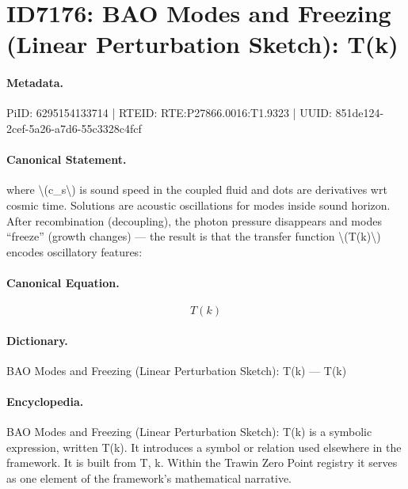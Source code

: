 \section*{ID7176: BAO Modes and Freezing (Linear Perturbation Sketch): T(k)}
\paragraph{Metadata.}
PiID: 6295154133714 | RTEID: RTE:P27866.0016:T1.9323 | UUID: 851de124-2cef-5a26-a7d6-55c3328c4fcf

\paragraph{Canonical Statement.}
where \textbackslash{}(c\_s\textbackslash{}) is sound speed in the coupled fluid and dots are derivatives wrt cosmic time. Solutions are acoustic oscillations for modes inside sound horizon. After recombination (decoupling), the photon pressure disappears and modes “freeze” (growth changes) — the result is that the transfer function \textbackslash{}(T(k)\textbackslash{}) encodes oscillatory features:

\paragraph{Canonical Equation.}
\[
T(k)
\]

\paragraph{Dictionary.}
BAO Modes and Freezing (Linear Perturbation Sketch): T(k) — T(k)

\paragraph{Encyclopedia.}
BAO Modes and Freezing (Linear Perturbation Sketch): T(k) is a symbolic expression, written T(k). It introduces a symbol or relation used elsewhere in the framework. It is built from T, k. Within the Trawin Zero Point registry it serves as one element of the framework's mathematical narrative.
